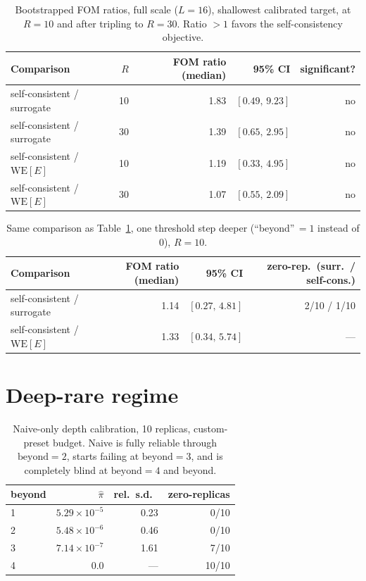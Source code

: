 \documentclass[11pt]{article}
\begin{document}
\begin{table}[h]
	\centering\small
	\caption{Bootstrapped FOM ratios, full scale ($L=16$), shallowest calibrated target, at
		$R=10$ and after tripling to $R=30$. Ratio $>1$ favors the self-consistency objective.}
	\label{tab:kimcaiboot}
	\begin{tabular}{lrrrr}
		\toprule
		Comparison & $R$ & FOM ratio (median) & 95\% CI & significant? \\
		\midrule
		self-consistent / surrogate & 10 & 1.83 & $[0.49,\,9.23]$ & no \\
		self-consistent / surrogate & 30 & 1.39 & $[0.65,\,2.95]$ & no \\
		self-consistent / $\mathrm{WE}[E]$ & 10 & 1.19 & $[0.33,\,4.95]$ & no \\
		self-consistent / $\mathrm{WE}[E]$ & 30 & 1.07 & $[0.55,\,2.09]$ & no \\
		\bottomrule
	\end{tabular}
\end{table}

\begin{table}[h]
	\centering\small
	\caption{Same comparison as Table~\ref{tab:kimcaiboot}, one threshold step deeper
		(``beyond''\,$=1$ instead of $0$), $R=10$.}
	\label{tab:kimcaideep}
	\begin{tabular}{lrrr}
		\toprule
		Comparison & FOM ratio (median) & 95\% CI & zero-rep.\ (surr.\ / self-cons.) \\
		\midrule
		self-consistent / surrogate & 1.14 & $[0.27,\,4.81]$ & 2/10 / 1/10 \\
		self-consistent / $\mathrm{WE}[E]$ & 1.33 & $[0.34,\,5.74]$ & --- \\
		\bottomrule
	\end{tabular}
\end{table}

\section{Deep-rare regime}

\begin{table}[h]
	\centering\small
	\caption{Naive-only depth calibration, 10 replicas, custom-preset budget. Naive is
		fully reliable through $\mathrm{beyond}=2$, starts failing at $\mathrm{beyond}=3$,
		and is completely blind at $\mathrm{beyond}=4$ and beyond.}
	\label{tab:deeprare}
	\begin{tabular}{lrrr}
		\toprule
		beyond & $\hat\pi$ & rel.\ s.d.\ & zero-replicas \\
		\midrule
		1 & $5.29\times10^{-5}$ & 0.23 & 0/10 \\
		2 & $5.48\times10^{-6}$ & 0.46 & 0/10 \\
		3 & $7.14\times10^{-7}$ & 1.61 & 7/10 \\
		4 & $0.0$ & --- & 10/10 \\
		\bottomrule
	\end{tabular}
\end{table}
\end{document}
